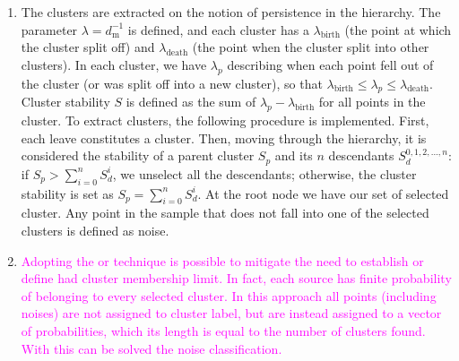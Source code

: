 \documentclass[fleqn,usenatbib]{mnras}
\newcommand{\rlopes}[1]{\textcolor{blue}{#1}}
\newcommand{\luis}[1]{\textcolor{magenta}{#1}}
\begin{document}
\begin{enumerate}
\item The clusters are extracted on the notion of persistence in the hierarchy.
  The parameter $\lambda = d_{\mathrm{m}}^{-1}$ is defined, and each cluster has a
  $\lambda_{\mathrm{birth}}$ (the point at which the cluster split off) and
  $\lambda_{\mathrm{death}}$ (the point when the cluster split into other clusters).
  In each cluster, we have $\lambda_p$ describing when each point fell out of the
  cluster (or was split off into a new cluster), so that $\lambda_{\mathrm{birth}} \leq \lambda_{p} \leq \lambda_{\mathrm{death}}$.
  Cluster stability $S$ is defined as the sum of $\lambda_{p} - \lambda_{\mathrm{birth}}$
  for all points in the cluster. To extract clusters, the following procedure is
  implemented. First, %
  each leave constitutes a cluster. Then, moving through the
  hierarchy, it is considered the stability of a parent cluster $S_p$ and its $n$ descendants
  $S_d^{0,1,2,...,n}$: if $S_p > \sum_{i=0}^{n} S_d^i$, we unselect all the descendants; otherwise,
  the cluster stability is set as 
  $S_p = \sum_{i=0}^{n} S_d^i$. At the root node we have our set of selected 
  cluster. Any point in the sample that does not fall into one of the selected
  clusters is defined as noise.

  
  \item \luis{Adopting the  or \texbf{fuzzy clustering} technique is possible to
  mitigate the need to establish or define had cluster membership limit. In fact, each source
  has finite probability of belonging to every selected cluster. In this approach all points 
  (including noises) are not assigned to cluster label, but are instead assigned to a vector of probabilities, which its length is equal to the number of clusters found. With this can be solved the noise classification.}
\end{enumerate}
\end{document}
